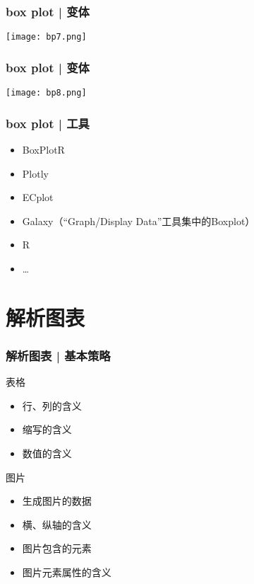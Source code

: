 \begin{frame}
  \frametitle{box plot | 变体}
  \begin{center}
    \texttt{[image: bp7.png]}
  \end{center}
\end{frame}

\begin{frame}
  \frametitle{box plot | 变体}
  \begin{center}
    \texttt{[image: bp8.png]}
  \end{center}
\end{frame}

\begin{frame}
  \frametitle{box plot | 工具}
  \begin{itemize}
    \item BoxPlotR
    \item Plotly
    \item ECplot
    \item Galaxy（“Graph/Display Data”工具集中的Boxplot）
    \item R
    \item \ldots
  \end{itemize}
\end{frame}

\section{解析图表}
\begin{frame}
  \frametitle{解析图表 | 基本策略}
  \begin{block}{表格}
    \begin{itemize}
      \item 行、列的含义
      \item 缩写的含义
      \item 数值的含义
    \end{itemize}
  \end{block}
  \pause
  \begin{block}{图片}
    \begin{itemize}
      \item 生成图片的数据
      \item 横、纵轴的含义
      \item 图片包含的元素
      \item 图片元素属性的含义
    \end{itemize}
  \end{block}
\end{frame}

